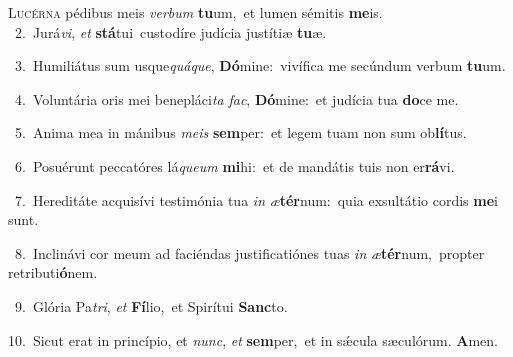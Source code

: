 \lettrine{\initial\textcolor{\initialcolor}{L}}{ucérna} pédibus meis \textit{ver}\-\textit{bum} \textbf{tu}\-um,~\star et lumen sémitis \textbf{me}\-is.\\
{\numbfont\textcolor{\numbcolor}{~2.}}~Jurá\-\textit{vi}\-, \textit{et} \textbf{stá}\-tui~\star custodíre judícia justítiæ \textbf{tu}\-æ.\par
{\numbfont\textcolor{\numbcolor}{~3.}}~Humiliátus sum usque\-\textit{quá}\-\textit{que}, \textbf{Dó}\-mine:~\star vivífica me secúndum verbum \textbf{tu}\-um.\par
{\numbfont\textcolor{\numbcolor}{~4.}}~Voluntária oris mei benepláci\textit{ta} \textit{fac}\-, \textbf{Dó}\-mine:~\star et judícia tua \textbf{do}\-ce me.\par
{\numbfont\textcolor{\numbcolor}{~5.}}~Anima mea in mánibus \textit{me}\-\textit{is} \textbf{sem}\-per:~\star et legem tuam non sum ob\-\textbf{lí}\-tus.\par
{\numbfont\textcolor{\numbcolor}{~6.}}~Posuérunt peccatóres lá\-\textit{que}\-\textit{um} \textbf{mi}\-hi:~\star et de mandátis tuis non er\-\textbf{rá}\-vi.\par
{\numbfont\textcolor{\numbcolor}{~7.}}~Hereditáte acquisívi testimónia tua \textit{in} \textit{æ}\-\textbf{tér}num:~\star quia exsultátio cordis \textbf{me}\-i sunt.\par
{\numbfont\textcolor{\numbcolor}{~8.}}~Inclinávi cor meum ad faciéndas justificatiónes tuas \textit{in} \textit{æ}\-\textbf{tér}num,~\star propter retributi\-\textbf{ó}\-nem.\par
{\numbfont\textcolor{\numbcolor}{~9.}}~Glória Pa\-\textit{tri}\-, \textit{et} \textbf{Fí}\-lio,~\star et Spirítui \textbf{Sanc}\-to.\par
{\numbfont\textcolor{\numbcolor}{10.}}~Sicut erat in princípio, et \textit{nunc}\-, \textit{et} \textbf{sem}\-per,~\star et in sǽcula sæculórum. \textbf{A}\-men.\par
